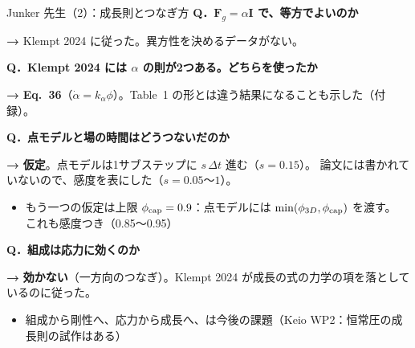 \documentclass[aspectratio=169,11pt]{beamer}
\newcommand{\Q}[1]{\textbf{Q．#1}}
\newcommand{\A}[1]{\vspace{2pt}\colorbox{c3!10}{\parbox{0.95\linewidth}{%
  \small\textbf{→ }#1}}\vspace{3pt}}
\begin{document}
\begin{frame}{Junker 先生（2）：成長則とつなぎ方}
\small\Q{$\mathbf F_g=\alpha\mathbf I$ で、等方でよいのか}
\A{Klempt 2024 に従った。異方性を決めるデータがない。}
\vspace{2pt}
\small\Q{Klempt 2024 には $\alpha$ の則が2つある。どちらを使ったか}
\A{\textbf{Eq.~36}（$\dot\alpha=k_\alpha\phi$）。Table~1 の形とは違う結果になることも示した（付録）。}
\vspace{2pt}
\small\Q{点モデルと場の時間はどうつないだのか}
\A{\textbf{仮定}。点モデルは1サブステップに $s\,\Delta t$ 進む（$s=0.15$）。
論文には書かれていないので、感度を表にした（$s=0.05$〜$1$）。}
\begin{itemize}\footnotesize
  \item もう一つの仮定は上限 $\phi_{\rm cap}=0.9$：点モデルには $\min(\phi_{3D},\phi_{\rm cap})$ を渡す。
        これも感度つき（0.85〜0.95）
\end{itemize}
\vspace{2pt}
\small\Q{組成は応力に効くのか}
\A{\textbf{効かない}（一方向のつなぎ）。Klempt 2024 が成長の式の力学の項を落としているのに従った。}
\begin{itemize}\footnotesize
  \item 組成から剛性へ、応力から成長へ、は今後の課題（Keio WP2：恒常圧の成長則の試作はある）
\end{itemize}
\end{frame}
\end{document}
